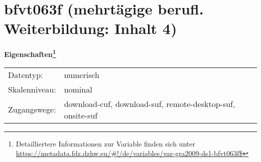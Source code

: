 
    \setcounter{footnote}{0}

    \vspace*{-1.8cm}
	\section{bfvt063f (mehrtägige berufl. Weiterbildung: Inhalt 4)}
	\label{section:bfvt063f}



    \vspace*{0.5cm}
    \noindent\textbf{Eigenschaften\footnote{Detailliertere Informationen zur Variable finden sich unter
		\url{https://metadata.fdz.dzhw.eu/\#!/de/variables/var-gra2009-ds1-bfvt063f$}}}\\
	\begin{tabularx}{\hsize}{@{}lX}
	Datentyp: & numerisch \\
	Skalenniveau: & nominal \\
	Zugangswege: &
	  download-cuf, 
	  download-suf, 
	  remote-desktop-suf, 
	  onsite-suf
 \\
    \end{tabularx}



